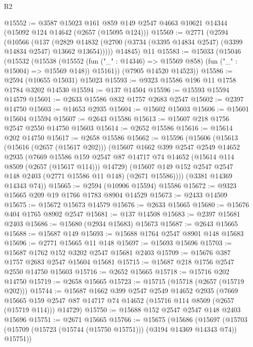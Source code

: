 \begin{lexlean}{R2}
\begin{coremodule}
@15552 := @3587
    @15023
    @161
    @859
    @149
    @2547
    @4663
    @10621
    @14344
    (@15092 @124 @14642 (@2657 (@15095 @124)))
@15569 := @2771
    (@2594
      (@10566
        (@137
          (@2829 @14832 (@2700 (@3734 (@3395 @14834 @2547) (@3399 @14834 @2547) @13662 @13654)))))
      @14845)
    @11
@15583 := @15033
    (@15046
      (@15532
        (@15538
          (@15552 (fun ("_" : @14346) => @15569 @858) (fun ("_" : @15004) => @15569 @148))
          @15161))
      (@7905 @14520 @14523))
@15586 := @2594 (@10655 @15031) @15023
@15593 := @9323 @15586 @196 @11 @1758 @1784 @3202 @14530
@15594 := @137 @14504
@15596 := @15593 @15594 @14579
@15601 := @2633 @15586 @832 @1757 @2683 @2547
@15602 := @2397 @14750
@15603 := @14653 @2935
@15604 := @15602 @15603
@15606 := @15601 @15604 @15594
@15607 := @2643 @15586
@15613 := @15607 @218 @1756 @2547 @2550 @14750 @15603
@15614 := @2652 @15586
@15616 := @15614 @202 @14750
@15617 := @2658 @15586
@15662 := @15596
    (@15606
      (@15613
        (@15616 (@2657 (@15617 @202)))
        (@15607
          @1662
          @399
          @2547
          @2549
          @14652
          @2935
          (@7669
            @15586
            @159
            @2547
            @87
            @14717
            @74
            @14652
            (@15614 @114 @8509 (@2657 (@15617 @114)))
            @14729)
          (@15607 @149 @152 @2547 @2547 @148 @2403 (@2771 @15586 @11 @148) (@2671 @15586))))
      (@3381 @14369 @14343 @74))
@15665 := @2594 (@10906 @15594) @15586
@15672 := @9323 @15665 @209 @19 @1766 @1783 @8904 @14529
@15673 := @2433 @14509
@15675 := @15672 @15673 @14579
@15676 := @2633 @15665
@15680 := @15676 @404 @1765 @8902 @2547
@15681 := @137 @14508
@15683 := @2397 @15681 @2403
@15686 := @15680 (@2934 @15683) @15673
@15687 := @2643 @15665
@15688 := @15687 @149
@15693 := @15688 @1764 @2547 @8901 @148 @15683
@15696 := @2771 @15665 @11 @148
@15697 := @15693 @15696
@15703 := @15687 @1762 @152 @3202 @2547 @15681 @2403
@15709 := @15676 @387 @1757 @2683 @2547 @15604 @15681
@15715 := @15687 @218 @1756 @2547 @2550 @14750 @15603
@15716 := @2652 @15665
@15718 := @15716 @202 @14750
@15719 := @2658 @15665
@15723 := @15715 (@15718 (@2657 (@15719 @202)))
@15744 := @15687
    @1662
    @399
    @2547
    @2549
    @14652
    @2935
    (@7669 @15665 @159 @2547 @87 @14717 @74 @14652 (@15716 @114 @8509 (@2657 (@15719 @114))) @14729)
@15750 := @15688 @152 @2547 @2547 @148 @2403 @15696
@15751 := @2671 @15665
@15766 := @15675
    (@15686
      (@15697 (@15703 (@15709 (@15723 (@15744 (@15750 @15751))) (@3194 @14369 @14343 @74)) @15751))

\end{coremodule}
\end{lexlean}
